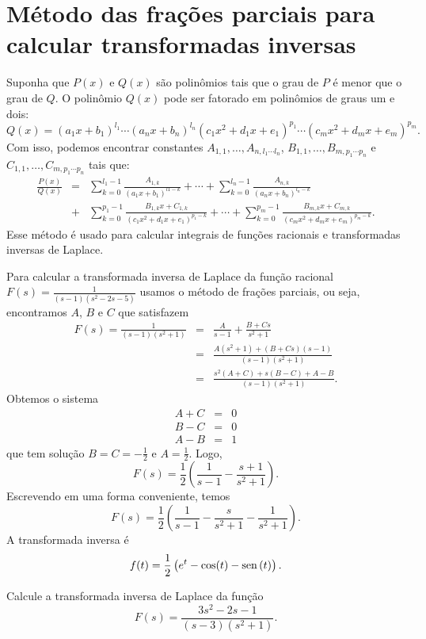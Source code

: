 \section{Método das frações parciais para calcular transformadas inversas}
Suponha que $P(x)$ e $Q(x)$ são polinômios tais que o grau de $P$ é menor que o grau de $Q$. O polinômio $Q(x)$ pode ser fatorado em polinômios de graus um e dois:
 \begin{equation}
Q(x) = (a_1x + b_1)^{l_1}\cdots (a_nx + b_n)^{l_n}(c_1x^2 + d_1x + e_1)^{p_1}\cdots (c_m x^2 + d_m x + e_m)^{p_m}.
\end{equation}
Com isso, podemos encontrar constantes $A_{1,1}, \ldots, A_{n,l_1\cdots l_n}$, $B_{1,1}, \ldots, B_{m,p_1\cdots p_n}$ e $C_{1,1}, \ldots, C_{m,p_1\cdots p_n}$ tais que:
\begin{eqnarray*}
\frac{P(x)}{Q(x)} &=& \sum_{k=0}^{l_1-1} \frac{A_{1,k}}{(a_1x + b_1)^{l1-k}} + \cdots + \sum_{k=0}^{l_n-1}\frac{A_{n,k}}{(a_nx + b_n)^{l_n-k}} \\&+& \sum_{k=0}^{p_1-1} \frac{B_{1,k}x + C_{1,k}}{(c_1 x^2 + d_1 x + e_1)^{p_1-k}} + \cdots + \sum_{k=0}^{p_m-1} \frac{B_{m,k}x + C_{m,k}}{(c_mx^2 + d_mx + e_m)^{p_m-k}}.
\end{eqnarray*}
Esse método é usado para calcular integrais de funções racionais e transformadas inversas de Laplace.
\begin{ex}Para calcular a transformada inversa de Laplace da função racional $F(s)=\frac{1}{(s-1)(s^2-2s-5)}$ usamos o método de frações parciais, ou seja, encontramos $A$, $B$ e $C$ que satisfazem
\begin{eqnarray*}
 F(s)=\frac{1}{(s-1)(s^2+1)}&=&\frac{A}{s-1}+\frac{B+Cs}{s^2+1}\\&=&\frac{A(s^2+1)+(B+Cs)(s-1)}{(s-1)(s^2+1)}\\
 &=&\frac{s^2(A+C)+s(B-C)+A-B}{(s-1)(s^2+1)}.
\end{eqnarray*}
Obtemos o sistema
\begin{eqnarray*}
A+C&=&0\\
B-C&=&0\\
A-B&=&1
\end{eqnarray*}
que tem solução $B=C=-\frac{1}{2}$ e $A=\frac{1}{2}$. Logo,
 \begin{equation}
F(s)=\frac{1}{2}\left(\frac{1}{s-1}-\frac{s+1}{s^2+1}\right).
\end{equation}
Escrevendo em uma forma conveniente, temos
 \begin{equation}
F(s)=\frac{1}{2}\left(\frac{1}{s-1}-\frac{s}{s^2+1}-\frac{1}{s^2+1}\right).
\end{equation}
A transformada inversa é
 \begin{equation}
f(t)=\frac{1}{2}\left(e^{t}-\cos(t)-\operatorname{sen}\,(t)\right).
\end{equation}
\end{ex}
\begin{exer}Calcule a transformada inversa de Laplace da função 
 \begin{equation}
F(s)=\frac{3s^2-2s-1}{(s-3)(s^2+1)}.
\end{equation}
\end{exer}
